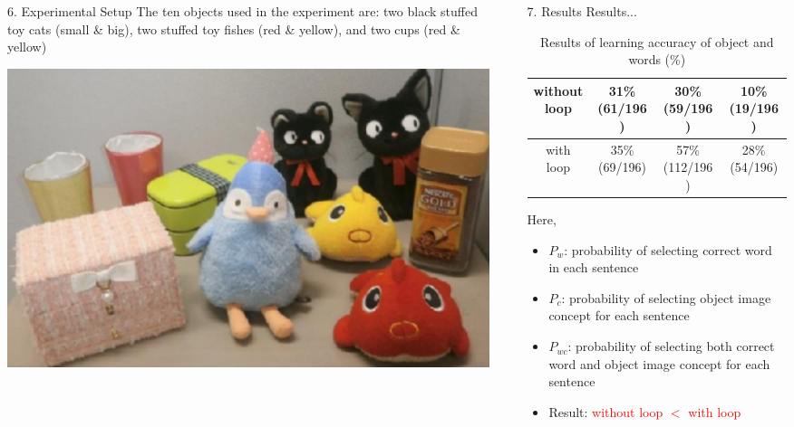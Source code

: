 \documentclass[final,hyperref={pdfpagelabels=false}]{beamer}
\begin{document}
\begin{frame}[t]
\begin{columns}[t]
\begin{column}{.3\textwidth}
    \begin{block}{6. Experimental Setup}
The ten objects used in the experiment are: two black stuffed toy cats (small \& big), two stuffed toy fishes (red \& yellow), and two cups (red \& yellow)\\
      \begin{center}
        \includegraphics[width=0.4\columnwidth]{./fig/ten_objects.pdf}
      \end{center}
    \end{block}

  \end{column} %


  \begin{column}{.02\textwidth}\end{column} %

  \begin{column}{.3\textwidth} %

    \begin{block}{7. Results}
      Results... \\
    \begin{table}
       \caption{Results of learning accuracy of object and words (\%)}
        \label{tab:result}
        \begin{tabular}{|c||c|c|c|}
        \hline
           without loop & 31\% (61/196) & 30\% (59/196) &  10\% (19/196) \\
        \hline
           with loop & 35\% (69/196) & 57\% (112/196) & 28\% (54/196) \\
        \hline
        \end{tabular}
    \end{table}
    Here, 
    \begin{itemize}
        \item $P_{w}$: probability of selecting correct word in each sentence
        \item $P_{c}$: probability of selecting object image concept for each sentence
        \item $P_{wc}$: probability of selecting both correct word and object image concept for each sentence
        \item Result: \textcolor{red}{without loop $<$ with loop}
    \end{itemize}
    \end{block}


\end{column}
\end{columns}
\end{frame}
\end{document}
